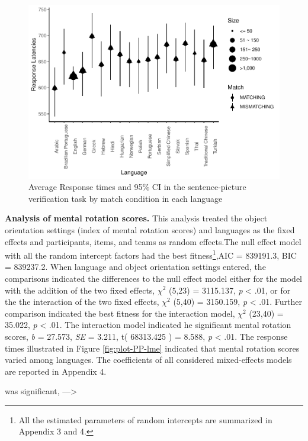 \documentclass[
  man,floatsintext]{apa6}
\begin{document}
\begin{figure}
\centering
\includegraphics{Stage2_Report_0824_files/figure-latex/plot-SP-lme-coef-1.pdf}
\caption{\label{fig:plot-SP-lme-coef}Average Response times and 95\% CI in the sentence-picture verification task by match condition in each language}
\end{figure}

\textbf{Analysis of mental rotation scores.} This analysis treated the object orientation settings (index of mental rotation scores) and languages as the fixed effects and participants, items, and teams as random effects.The null effect model with all the random intercept factors had the best fitness\footnote{All the estimated parameters of random intercepts are summarized in Appendix 3 and 4.},AIC = 839191.3, BIC = 839237.2. When language and object orientation settings entered, the comparisons indicated the differences to the null effect model either for the model with the addition of the two fixed effects, \({\chi}^2\) (5,23) = 3115.137, \emph{p} \textless{} .01, or for the the interaction of the two fixed effects, \({\chi}^2\) (5,40) = 3150.159, \emph{p} \textless{} .01. Further comparison indicated the best fitness for the interaction model, \({\chi}^2\) (23,40) = 35.022, \emph{p} \textless{} .01. The interaction model indicated he significant mental rotation scores, \emph{b} = 27.573, \emph{SE} = 3.211, t( 68313.425 ) = 8.588, \emph{p} \textless{} .01. The response times illustrated in Figure \ref{fig:plot-PP-lme} indicated that mental rotation scores varied among languages. The coefficients of all considered mixed-effects models are reported in Appendix 4.

was significant, ---\textgreater{}
\end{document}
